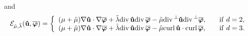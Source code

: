 \documentclass[final,reqno]{siamltex}
\newcommand{\ov}{\overline}
\newcommand{\curl}{{\rm curl\,}}
\newcommand{\dive}{{\rm div\,}}
\newcommand{\na}{\nabla}
\begin{document}
and 
\begin{align*}
  \mathcal{E}_{\tilde{\mu},\tilde{\lambda}}(\mathbf{\hat u},\ov{\boldsymbol{\varphi}})=
  \left\{
  \begin{array}{ll}
  	(\mu+\tilde{\mu})\nabla\mathbf{\hat u}\cdot\na\ov{\boldsymbol{\varphi}}+\tilde{\lambda}\dive\mathbf{\hat u}\dive\ov{\boldsymbol{\varphi}}-\tilde{\mu}\dive^\perp\mathbf{\hat u}\dive^\perp\ov{\boldsymbol{\varphi}},~~~&{\rm if}~d=2,\\
  	(\mu+\tilde{\mu})\nabla\mathbf{\hat u}\cdot\na\ov{\boldsymbol{\varphi}}+\tilde{\lambda}\dive\mathbf{\hat u}\dive\ov{\boldsymbol{\varphi}}-\tilde{\mu}\curl\mathbf{\hat u}\cdot\curl\ov{\boldsymbol{\varphi}},~~~&{\rm if}~d=3. 
  \end{array}
  \right.
\end{align*}
\end{document}
